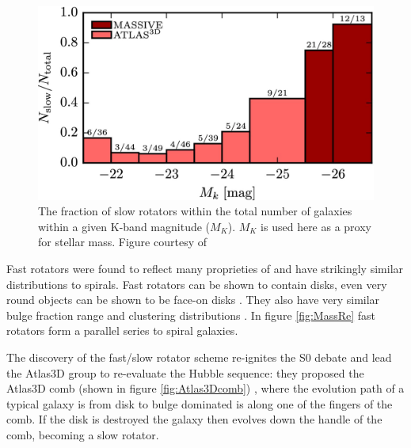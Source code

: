 	\begin{figure}
		\centering
		\includegraphics[width=\textwidth]{introduction/slowRotFraction.jpeg}
		\caption[Proportion of Slow Rotating Galaxies as a function of Mass]{The fraction of slow rotators within the total number of galaxies within a given K-band magnitude ($M_K$). $M_K$ is used here as a proxy for stellar mass. Figure courtesy of \citet{Veale2016}}
		\label{fig:SlowRotFrac}
	\end{figure}

	Fast rotators were found to reflect many proprieties of and have strikingly similar distributions to spirals. Fast rotators can be shown to contain disks, even very round objects can be shown to be face-on disks \citep{Cappellari2013a, Weijmans2014}. They also have very similar bulge fraction range \citep{Krajnovic2013} and clustering distributions \citep{}. %
	In figure \ref{fig:MassRe} fast rotators form a parallel series to spiral galaxies.

	The discovery of the fast/slow rotator scheme re-ignites the S0 debate and lead the Atlas3D group to re-evaluate the Hubble sequence: they proposed the Atlas3D comb (shown in figure \ref{fig:Atlas3Dcomb}) \citep{Cappellari2011a}, where the evolution path of a typical galaxy is from disk to bulge dominated is along one of the fingers of the comb. If the disk is destroyed the galaxy then evolves down the handle of the comb, becoming a slow rotator. 

